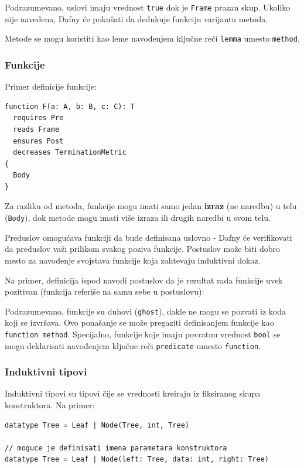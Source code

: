 Podrazumevano, uslovi imaju vrednost \texttt{true} dok je \texttt{Frame} prazan skup. Ukoliko nije navedena, Dafny će pokušati da dedukuje funkciju varijantu metoda.

Metode se mogu koristiti kao leme navođenjem ključne reči \texttt{lemma} umesto \texttt{method}.

\subsubsection{Funkcije}\label{funkcije}

Primer definicije funkcije:

\begin{verbatim}
function F(a: A, b: B, c: C): T
  requires Pre
  reads Frame
  ensures Post
  decreases TerminationMetric
{
  Body
}
\end{verbatim}

Za razliku od metoda, funkcije mogu imati samo jedan \textbf{izraz} (ne naredbu) u telu (\texttt{Body}), dok metode mogu imati više izraza ili drugih naredbi u svom telu.

Preduslov omogućava funkciji da bude definisana uslovno - Dafny će verifikovati da preduslov važi prilikom svakog poziva funkcije. Postuslov može biti dobro mesto za navođenje svojstava funkcije koja zahtevaju induktivni dokaz.

Na primer, definicija ispod navodi postuslov da je rezultat rada funkcije uvek pozitivan (funkcija referiše na samu sebe u postuslovu):


Podrazumevano, funkcije su duhovi (\texttt{ghost}), dakle ne mogu se pozvati iz koda koji se izvršava. Ovo ponašanje se može pregaziti definisanjem funkcije kao \texttt{function\ method}. Specijalno, funkcije koje imaju povratnu vrednost \texttt{bool} se mogu deklarisati navođenjem ključne reči \texttt{predicate} umesto \texttt{function}.

\subsubsection{Induktivni tipovi}\label{induktivni-tipovi}

Induktivni tipovi su tipovi čije se vrednosti kreiraju iz fiksiranog skupa konstruktora. Na primer:

\begin{verbatim}
datatype Tree = Leaf | Node(Tree, int, Tree)

// moguce je definisati imena parametara konstruktora
datatype Tree = Leaf | Node(left: Tree, data: int, right: Tree)
\end{verbatim}

